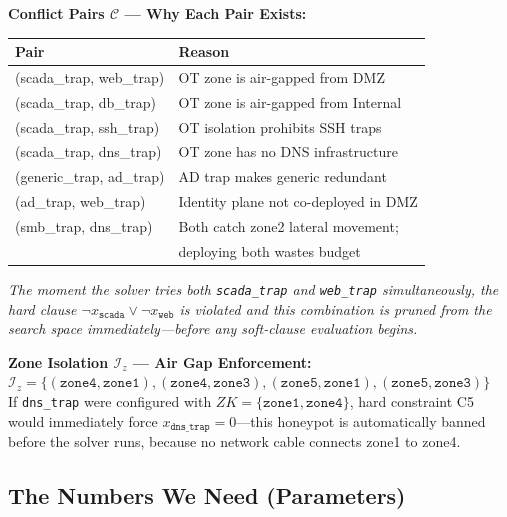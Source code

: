 \documentclass[journal]{IEEEtran}
\newcommand{\calC}{\mathcal{C}}
\begin{document}
\begin{examplebox}
\textbf{Conflict Pairs $\calC$ --- Why Each Pair Exists:}
\begin{center}
\small
\renewcommand{\arraystretch}{1.1}
\begin{tabular}{@{}ll@{}}
\toprule
\textbf{Pair} & \textbf{Reason} \\
\midrule
(scada\_trap, web\_trap)  & OT zone is air-gapped from DMZ \\
(scada\_trap, db\_trap)   & OT zone is air-gapped from Internal \\
(scada\_trap, ssh\_trap)  & OT isolation prohibits SSH traps \\
(scada\_trap, dns\_trap)  & OT zone has no DNS infrastructure \\
(generic\_trap, ad\_trap) & AD trap makes generic redundant \\
(ad\_trap, web\_trap)     & Identity plane not co-deployed in DMZ \\
(smb\_trap, dns\_trap)    & Both catch zone2 lateral movement;\\
                          & deploying both wastes budget \\
\bottomrule
\end{tabular}
\end{center}
\textit{The moment the solver tries both
\texttt{scada\_trap} and \texttt{web\_trap} simultaneously,
the hard clause $\neg x_{\texttt{scada}} \vee
\neg x_{\texttt{web}}$ is violated and this combination
is pruned from the search space immediately---before any
soft-clause evaluation begins.}
\end{examplebox}

\begin{examplebox}
\textbf{Zone Isolation $\mathcal{I}_z$ --- Air Gap
Enforcement:}\\[3pt]
$\mathcal{I}_z = \{(\texttt{zone4},\texttt{zone1}),
(\texttt{zone4},\texttt{zone3}),
(\texttt{zone5},\texttt{zone1}),
(\texttt{zone5},\texttt{zone3})\}$\\[4pt]
If \texttt{dns\_trap} were configured with
$ZK = \{\texttt{zone1},\texttt{zone4}\}$, hard constraint C5
would immediately force $x_{\texttt{dns\_trap}} = 0$---this
honeypot is automatically banned before the solver runs,
because no network cable connects zone1 to zone4.
\end{examplebox}

\subsection{The Numbers We Need (Parameters)}
\end{document}
